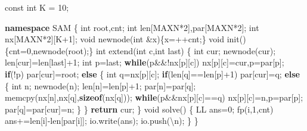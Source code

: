 \documentclass[
]{article}
\newenvironment{Shaded}{}{}
\newcommand{\AttributeTok}[1]{\textcolor[rgb]{0.49,0.56,0.16}{#1}}
\newcommand{\CharTok}[1]{\textcolor[rgb]{0.25,0.44,0.63}{#1}}
\newcommand{\ControlFlowTok}[1]{\textcolor[rgb]{0.00,0.44,0.13}{\textbf{#1}}}
\newcommand{\DataTypeTok}[1]{\textcolor[rgb]{0.56,0.13,0.00}{#1}}
\newcommand{\DecValTok}[1]{\textcolor[rgb]{0.25,0.63,0.44}{#1}}
\newcommand{\KeywordTok}[1]{\textcolor[rgb]{0.00,0.44,0.13}{\textbf{#1}}}
\newcommand{\NormalTok}[1]{#1}
\newcommand{\SpecialCharTok}[1]{\textcolor[rgb]{0.25,0.44,0.63}{#1}}
\begin{document}
\begin{Shaded}
\begin{Highlighting}[]
\AttributeTok{const} \DataTypeTok{int}\NormalTok{ K = }\DecValTok{10}\NormalTok{;}

\KeywordTok{namespace}\NormalTok{ SAM}
\NormalTok{\{}
    \DataTypeTok{int}\NormalTok{ root,cnt;}
    \DataTypeTok{int}\NormalTok{ len[MAXN*}\DecValTok{2}\NormalTok{],par[MAXN*}\DecValTok{2}\NormalTok{];}
    \DataTypeTok{int}\NormalTok{ nx[MAXN*}\DecValTok{2}\NormalTok{][K+}\DecValTok{1}\NormalTok{];}
    \DataTypeTok{void}\NormalTok{ newnode(}\DataTypeTok{int}\NormalTok{ \&x)\{x=++cnt;\}}
    \DataTypeTok{void}\NormalTok{ init()\{cnt=}\DecValTok{0}\NormalTok{,newnode(root);\}}
    \DataTypeTok{int}\NormalTok{ extend(}\DataTypeTok{int}\NormalTok{ c,}\DataTypeTok{int}\NormalTok{ last)}
\NormalTok{    \{}
        \DataTypeTok{int}\NormalTok{ cur;}
\NormalTok{        newnode(cur);}
\NormalTok{        len[cur]=len[last]+}\DecValTok{1}\NormalTok{;}
        \DataTypeTok{int}\NormalTok{ p=last;}
        \ControlFlowTok{while}\NormalTok{(p\&\&!nx[p][c])}
\NormalTok{            nx[p][c]=cur,p=par[p];}
        \ControlFlowTok{if}\NormalTok{(!p) par[cur]=root;}
        \ControlFlowTok{else}
\NormalTok{        \{}
            \DataTypeTok{int}\NormalTok{ q=nx[p][c];}
            \ControlFlowTok{if}\NormalTok{(len[q]==len[p]+}\DecValTok{1}\NormalTok{) par[cur]=q;}
            \ControlFlowTok{else}
\NormalTok{            \{}
                \DataTypeTok{int}\NormalTok{ n;}
\NormalTok{                newnode(n);}
\NormalTok{                len[n]=len[p]+}\DecValTok{1}\NormalTok{;}
\NormalTok{                par[n]=par[q];}
\NormalTok{                memcpy(nx[n],nx[q],}\KeywordTok{sizeof}\NormalTok{(nx[q]));}
                \ControlFlowTok{while}\NormalTok{(p\&\&nx[p][c]==q)}
\NormalTok{                    nx[p][c]=n,p=par[p];}
\NormalTok{                par[q]=par[cur]=n;}
\NormalTok{            \}}
\NormalTok{        \}}
        \ControlFlowTok{return}\NormalTok{ cur;}
\NormalTok{    \}}
    \DataTypeTok{void}\NormalTok{ solve()}
\NormalTok{    \{}
\NormalTok{        LL ans=}\DecValTok{0}\NormalTok{;}
\NormalTok{        fp(i,}\DecValTok{1}\NormalTok{,cnt) ans+=len[i]{-}len[par[i]];}
\NormalTok{        io.write(ans);}
\NormalTok{        io.push(}\CharTok{\textquotesingle{}}\SpecialCharTok{\textbackslash{}n}\CharTok{\textquotesingle{}}\NormalTok{);}
\NormalTok{    \}}
\NormalTok{\}}


\end{Highlighting}
\end{Shaded}
\end{document}
